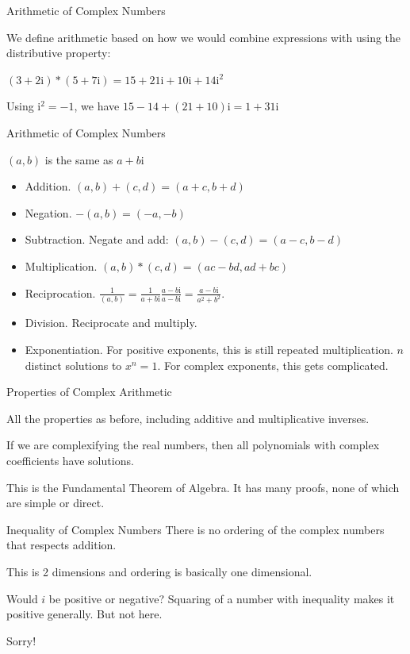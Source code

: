 \documentclass{beamer}
\begin{document}
\begin{frame}{Arithmetic of Complex Numbers}

We define arithmetic based on how we would combine expressions with using the distributive property: 

$ (3 + 2\mathrm{i})*(5 + 7\mathrm{i}) 
 =  15 +21 \mathrm{i} + 10 \mathrm{i} + 14 \mathrm{i}^2 $

Using $\mathrm{i}^2 = -1$, we have  $ 15 - 14 + (21 +10) \mathrm{i} = 1 + 31\mathrm{i} $
 
\end{frame}

\begin{frame}{Arithmetic of Complex Numbers}

$(a,b)$ is the same as $a + b \mathrm{i}$

\begin{itemize}
\item Addition.  $(a,b) + (c,d) = (a+c, b+d)$
\item Negation. $-(a,b) = (-a, -b)$
\item Subtraction. Negate and add:  $(a,b) - (c,d) = (a-c, b-d)$
\item Multiplication.  $(a,b)*(c,d) = (ac - bd, ad + bc)$
\item Reciprocation. $\frac{1}{(a,b)} = \frac{1}{a+b \mathrm{i}} \frac{a-b\mathrm{i}}{a - b \mathrm{i}} =  \frac{a - b \mathrm{i}}{a^2 + b^2}$.
\item Division. Reciprocate and multiply. 
\item Exponentiation. For positive exponents, this is still repeated multiplication. $n$ distinct solutions to $x^n = 1$. For complex exponents, this gets complicated. 
\end{itemize} 

\end{frame}

\begin{frame}{Properties of Complex Arithmetic}

All the properties as before, including additive and multiplicative inverses. 

If we are complexifying the real numbers, then all polynomials with complex coefficients have solutions.

This is the Fundamental Theorem of Algebra. It has many proofs, none of which are simple or direct.  

\end{frame}

\begin{frame}{Inequality of Complex Numbers}
    There is no ordering of the complex numbers that respects addition. 

    This is 2 dimensions and ordering is basically one dimensional. 

    Would $i$ be positive or negative?  Squaring of a number with inequality makes it positive generally. But not here. 

    Sorry!
\end{frame}
\end{document}
